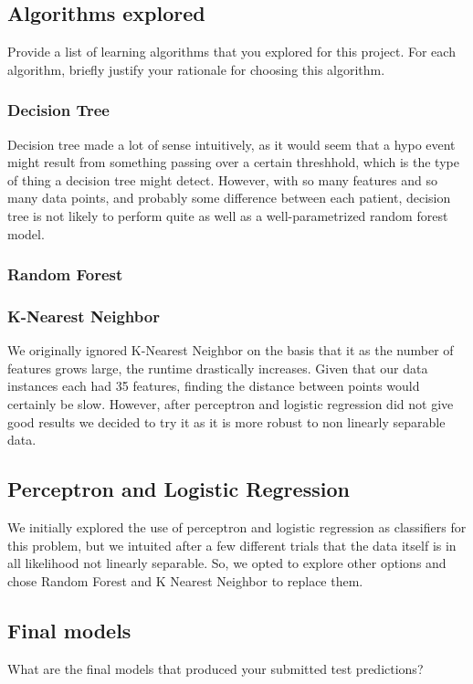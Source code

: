\documentclass[11pt,a4paper]{article}
\begin{document}
\subsection{Algorithms explored}
Provide a list of learning algorithms that you explored for this project. For each algorithm, briefly justify your rationale for choosing this algorithm.

\subsubsection{Decision Tree}
Decision tree made a lot of sense intuitively, as it would seem that a hypo event might result from something passing over a certain threshhold, which is the type of thing a decision tree might detect. However, with so many features and so many data points, and probably some difference between each patient, decision tree is not likely to perform quite as well as a well-parametrized random forest model.

\subsubsection{Random Forest}


\subsubsection{K-Nearest Neighbor}
We originally ignored K-Nearest Neighbor on the basis that it as the number of features grows large, the runtime drastically increases. Given that our data instances each had 35 features, finding the distance between points would certainly be slow. However, after perceptron and logistic regression did not give good results we decided to try it as it is more robust to non linearly separable data.


\subsection{Perceptron and Logistic Regression}
We initially explored the use of perceptron and logistic regression as classifiers for this problem, but we intuited after a few different trials that the data itself is in all likelihood not linearly separable. So, we opted to explore other options and chose Random Forest and K Nearest Neighbor to replace them.


\subsection{Final models}
What are the final models that produced your submitted test predictions?
\end{document}

